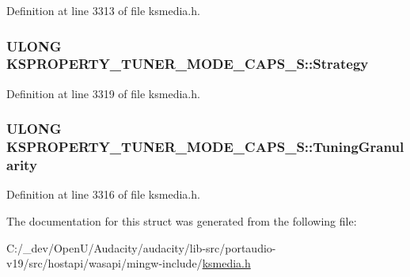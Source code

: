 Definition at line 3313 of file ksmedia.\+h.

\subsubsection[{\texorpdfstring{Strategy}{Strategy}}]{\setlength{\rightskip}{0pt plus 5cm}U\+L\+O\+NG K\+S\+P\+R\+O\+P\+E\+R\+T\+Y\+\_\+\+T\+U\+N\+E\+R\+\_\+\+M\+O\+D\+E\+\_\+\+C\+A\+P\+S\+\_\+\+S\+::\+Strategy}\hypertarget{struct_k_s_p_r_o_p_e_r_t_y___t_u_n_e_r___m_o_d_e___c_a_p_s___s_a338c79f99dadd9248fb564e0fbce6a00}{}\label{struct_k_s_p_r_o_p_e_r_t_y___t_u_n_e_r___m_o_d_e___c_a_p_s___s_a338c79f99dadd9248fb564e0fbce6a00}


Definition at line 3319 of file ksmedia.\+h.

\subsubsection[{\texorpdfstring{Tuning\+Granularity}{TuningGranularity}}]{\setlength{\rightskip}{0pt plus 5cm}U\+L\+O\+NG K\+S\+P\+R\+O\+P\+E\+R\+T\+Y\+\_\+\+T\+U\+N\+E\+R\+\_\+\+M\+O\+D\+E\+\_\+\+C\+A\+P\+S\+\_\+\+S\+::\+Tuning\+Granularity}\hypertarget{struct_k_s_p_r_o_p_e_r_t_y___t_u_n_e_r___m_o_d_e___c_a_p_s___s_aec2eafe1309dcbd7afb535f1826c7f34}{}\label{struct_k_s_p_r_o_p_e_r_t_y___t_u_n_e_r___m_o_d_e___c_a_p_s___s_aec2eafe1309dcbd7afb535f1826c7f34}


Definition at line 3316 of file ksmedia.\+h.



The documentation for this struct was generated from the following file\+:\begin{DoxyCompactItemize}
\item 
C\+:/\+\_\+dev/\+Open\+U/\+Audacity/audacity/lib-\/src/portaudio-\/v19/src/hostapi/wasapi/mingw-\/include/\hyperlink{ksmedia_8h}{ksmedia.\+h}\end{DoxyCompactItemize}
